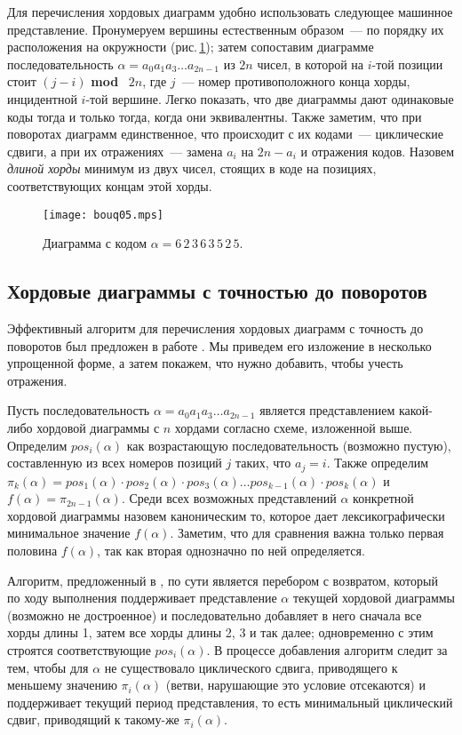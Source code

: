 \documentclass[a4paper,12pt]{article}
\def\figureref#1{рис.\,\protect\ref{#1}}
\let\picref=\figureref
\def\MOD{{\bf mod} \,}
\theoremstyle{plain}
\theoremstyle{definition}
\begin{document}
Для перечисления хордовых диаграмм удобно использовать следующее машинное представление. Пронумеруем вершины естественным
образом~--- по порядку их расположения на окружности (\picref{figure:chord-code}); затем сопоставим диаграмме
последовательность $\alpha = a_0 a_1 a_3 \dots a_{2 n - 1}$ из $2 n$ чисел, в которой на $i$-той позиции стоит $(j - i)$ \MOD
$2 n$, где $j$~--- номер противоположного конца хорды, инцидентной $i$-той вершине. Легко показать, что две диаграммы дают
одинаковые коды тогда и только тогда, когда они эквивалентны. Также заметим, что при поворотах диаграмм единственное, что
происходит с их кодами~--- циклические сдвиги, а при их отражениях~--- замена $a_i$ на $2 n - a_i$ и отражения кодов. Назовем
\textit{длиной хорды} минимум из двух чисел, стоящих в коде на позициях, соответствующих концам этой хорды.
\begin{figure}[!t]
\centering
\texttt{[image: bouq05.mps]}
\caption{Диаграмма с кодом $\alpha = 6\,2\,3\,6\,3\,5\,2\,5$. \label{figure:chord-code}}
\end{figure}


\subsection{Хордовые диаграммы с точностью до поворотов}

Эффективный алгоритм для перечисления хордовых диаграмм с точность до поворотов был предложен в работе \cite{Sawada2002}. Мы
приведем его изложение в несколько упрощенной форме, а затем покажем, что нужно добавить, чтобы учесть отражения.

Пусть последовательность $\alpha = a_0 a_1 a_3 \dots a_{2 n - 1}$ является представлением какой-либо хордовой диаграммы с $n$ хордами
согласно схеме, изложенной выше. Определим $pos_i(\alpha)$ как возрастающую последовательность (возможно пустую), составленную из всех
номеров позиций $j$ таких, что $a_j = i$. Также определим $\pi_k(\alpha) = pos_1(\alpha) \cdot pos_2(\alpha) \cdot pos_3(\alpha) \dots
pos_{k - 1}(\alpha) \cdot pos_k(\alpha)$ и $f(\alpha) = \pi_{2 n - 1}(\alpha)$. Среди всех возможных представлений $\alpha$ конкретной
хордовой диаграммы назовем каноническим то, которое дает лексикографически минимальное значение $f(\alpha)$. Заметим, что для сравнения
важна только первая половина $f(\alpha)$, так как вторая однозначно по ней определяется.

Алгоритм, предложенный в \cite{Sawada2002}, по сути является перебором с возвратом, который по ходу выполнения поддерживает
представление $\alpha$ текущей хордовой диаграммы (возможно не достроенное) и последовательно добавляет в него сначала все
хорды длины 1, затем все хорды длины 2, 3 и так далее; одновременно с этим строятся соответствующие $pos_i(\alpha)$. В процессе
добавления алгоритм следит за тем, чтобы для $\alpha$ не существовало циклического сдвига, приводящего к меньшему значению
$\pi_i(\alpha)$ (ветви, нарушающие это условие отсекаются) и поддерживает текущий период представления, то есть минимальный
циклический сдвиг, приводящий к такому-же $\pi_i(\alpha)$.
\end{document}
